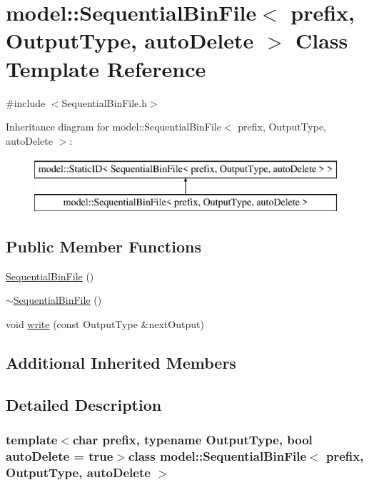 \hypertarget{classmodel_1_1_sequential_bin_file}{}\section{model\+:\+:Sequential\+Bin\+File$<$ prefix, Output\+Type, auto\+Delete $>$ Class Template Reference}
\label{classmodel_1_1_sequential_bin_file}


{\ttfamily \#include $<$Sequential\+Bin\+File.\+h$>$}

Inheritance diagram for model\+:\+:Sequential\+Bin\+File$<$ prefix, Output\+Type, auto\+Delete $>$\+:\begin{figure}[H]
\begin{center}
\leavevmode
\includegraphics[height=2.000000cm]{classmodel_1_1_sequential_bin_file}
\end{center}
\end{figure}
\subsection*{Public Member Functions}
\begin{DoxyCompactItemize}
\item 
\hyperlink{classmodel_1_1_sequential_bin_file_ad8f5f33b62ff41b3722c83af4ed39e25}{Sequential\+Bin\+File} ()
\item 
\hyperlink{classmodel_1_1_sequential_bin_file_a236967eb24cda5842ab8d38c8ed1d44d}{$\sim$\+Sequential\+Bin\+File} ()
\item 
void \hyperlink{classmodel_1_1_sequential_bin_file_a46c52a43d01f19d01def9060092e5ddf}{write} (const Output\+Type \&next\+Output)
\end{DoxyCompactItemize}
\subsection*{Additional Inherited Members}


\subsection{Detailed Description}
\subsubsection*{template$<$char prefix, typename Output\+Type, bool auto\+Delete = true$>$class model\+::\+Sequential\+Bin\+File$<$ prefix, Output\+Type, auto\+Delete $>$}



